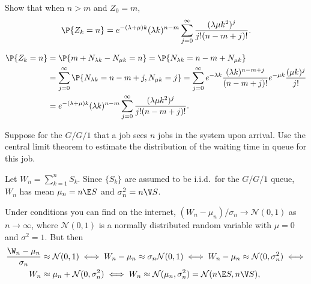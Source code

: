 \begin{exercise}\label{ex:l-134}
 Show
that when $n>m$ and $Z_0=m$,
\begin{equation*}
 \P{Z_k=n}
= e^{-(\lambda+\mu)k} (\lambda k)^{n-m} \sum_{j=0}^\infty
\frac{(\lambda\mu k^2)^j} {j!(n-m+j)!}.
\end{equation*}
\begin{solution}
\begin{align*}
 \P{Z_k=n}
&= \P{m+N_{\lambda k } - N_{\mu k} = n }
= \P{N_{\lambda k} = n - m + N_{\mu k}} \\
&= \sum_{j=0}^\infty \P{N_{\lambda k}  =  n - m + j, N_{\mu k} =j}
= \sum_{j=0}^\infty e^{-\lambda k} \frac{(\lambda k )^{n - m + j}}{(n-m+j)!} e^{-\mu k} \frac{(\mu k )^j}{j!} \\
&= e^{-(\lambda+\mu)k} (\lambda k)^{n-m} \sum_{j=0}^\infty  \frac{(\lambda\mu k^2)^j} {j!(n-m+j)!}.
\end{align*}
\end{solution}
\end{exercise}




\begin{exercise}\label{ex:l-147}
 Suppose
 for the $G/G/1$ that a job sees $n$ jobs in the system upon arrival.
 Use the central limit theorem to estimate the distribution of the waiting time in queue for this job.
\begin{hint}
 Let $W_{n} = \sum_{k=1}^n S_k$.
 Since $\{S_k\}$ are assumed to be i.i.d.\ for the $G/G/1$ queue, $W_{n}$ has mean $\mu_n = n \E S$ and $\sigma_n^2 = n\V S$.
\end{hint}
\begin{solution} Under conditions you can find on the internet, $(W_{n} - \mu_n)/\sigma_n \to \mathcal{N}(0,1)$ as $n\to \infty$,
 where $\mathcal{N}(0,1)$ is a normally distributed random variable
 with $\mu=0$ and $\sigma^2=1$. But then
 \begin{align*}
 \frac{\W_{n} - \mu_n}{\sigma_n} &\approx \mathcal{N}(0,1) \iff  W_{n} - \mu_n \approx \sigma_n \mathcal{N}(0,1) \iff
 W_{n} - \mu_n \approx \mathcal{N}(0,\sigma_n^2) \iff \\
 W_{n} &\approx \mu_n + \mathcal{N}(0,\sigma_n^2) \iff
 W_{n} \approx \mathcal{N}(\mu_n,\sigma_n^2) = \mathcal{N}(n\E S, n \V S),
 \end{align*}
\end{solution}
\end{exercise}




